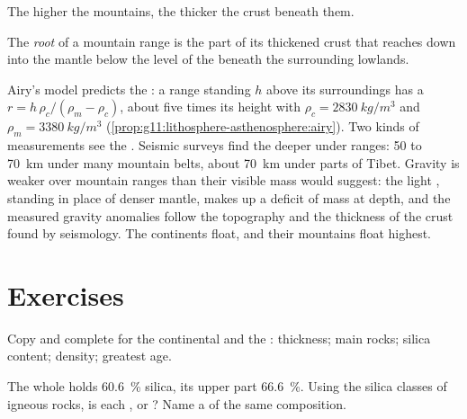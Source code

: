 The higher the mountains, the thicker the crust beneath them.

\begin{definition}\label{def:g12:continental-crust:root}
The \emph{root} of a mountain range is
the part of its thickened crust that reaches down into the mantle below the
level of the  beneath the surrounding lowlands.
\end{definition}

Airy's model predicts the : a range standing $h$ above its
surroundings has a  $r = h\,\rho_c/(\rho_m - \rho_c)$, about five times
its height with $\rho_c = \qty{2830}{kg/m^3}$ and $\rho_m =
\qty{3380}{kg/m^3}$ (\cref{prop:g11:lithosphere-asthenosphere:airy}). Two
kinds of measurements see the . Seismic surveys find the  deeper
under ranges: 50 to \qty{70}{km} under many mountain belts, about
\qty{70}{km} under parts of Tibet. Gravity is weaker over mountain ranges than
their visible mass would suggest: the light , standing in place of
denser mantle, makes up a deficit of mass at depth, and the measured gravity
anomalies follow the topography and the thickness of the crust found by
seismology. The continents float, and their mountains float highest.

\section{Exercises}

\begin{exercise}[$\star$]\label{exo:g12:continental-crust:1}
Copy and complete for the continental and the : thickness;
main rocks; silica content; density; greatest age.
\end{exercise}

\begin{exercise}[$\star$]\label{exo:g12:continental-crust:2}
The whole  holds \qty{60.6}{\percent} silica, its upper
part \qty{66.6}{\percent}. Using the silica classes of igneous rocks, is
each ,  or ? Name a  of the same
composition.
\end{exercise}

